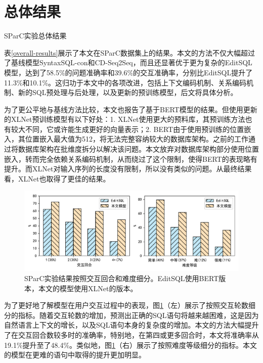 \section{总体结果}

\begin{table}
    \centering
    \caption{SParC实验总体结果}
    
    \label{overall-results}
\end{table}

表\ref{overall-results}展示了本文在SParC数据集上的结果。本文的方法不仅大幅超过了基线模型SyntaxSQL-con和CD-Seq2Seq，而且还显著优于更为复杂的EditSQL模型，达到了58.5\%的问题准确率和39.6\%的交互准确率，分别比EditSQL提升了11.3\%和10.1\%。这归功于本文中的各项改进，包括上下文编码机制、关系编码机制、新的SQL预处理与后处理，以及更新的预训练模型，后文将具体分析。

为了更公平地与基线方法比较，本文也报告了基于BERT模型的结果。但使用更新的XLNet预训练模型有以下好处：1. XLNet使用更大的预料库，其预训练方法也有较大不同，它或许能生成更好的向量表示；2. BERT由于使用预训练的位置嵌入，其位置嵌入最大值为512，将无法完整容纳较大的数据库架构。之前的工作通过将数据库架构在批维度拆分以解决该问题。本文放弃对数据库架构部分使用位置嵌入，转而完全依赖关系编码机制，从而绕过了这个限制，使得BERT的表现略有提升。而XLNet对输入序列的长度没有限制，所以没有类似的问题。从最终结果看，XLNet也取得了更佳的结果。

\begin{figure}
    \centering
    \includegraphics[width=\linewidth]{figure/overall.pdf}
    \caption{SParC实验结果按照交互回合和难度细分。EditSQL使用BERT版本，本文的模型使用XLNet的版本。}
    \label{result-subdivide}
\end{figure}

为了更好地了解模型在用户交互过程中的表现，图\ref{result-subdivide}（左）展示了按照交互轮数细分的指标。随着交互轮数的增加，预测出正确的SQL语句将越来越困难，这是因为自然语言上下文的增长，以及SQL语句本身的复杂度的增加。本文的方法大幅提升了在交互回合数较多时的准确率，特别地，在第四或更多回合时，本文将准确率从19.1\%提升至了48.4\%。类似地，图\ref{result-subdivide}（右）展示了按照难度等级细分的指标。本文的模型在更难的语句中取得的提升更加明显。

